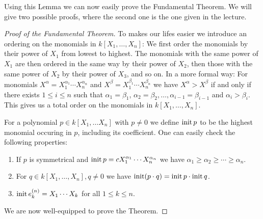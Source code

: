 Using this Lemma we can now easily prove the Fundamental Theorem.
We will give two possible proofs, where the second one is the one given in the lecture.


\begin{proof}[Proof of the Fundamental Theorem]
  To makes our lifes easier we introduce an ordering on the monomials in $k[X_1, \dotsc, X_n]$:
  We first order the monomials by their power of $X_1$ from lowest to highest.
  The monomials with the same power of $X_1$ are then ordered in the same way by their power of $X_2$, then those with the same power of $X_2$ by their power of $X_3$, and so on.
  In a more formal way:
  For monomials $X^\alpha = X_1^{\alpha_1} \dotsm X_n^{\alpha_n}$ and $X^\beta = X_1^{\beta_1} \dotsm X_n^{\beta_n}$ we have $X^\alpha > X^\beta$ if and only if there exists $1 \leq i \leq n$ such that $\alpha_1 = \beta_1$, $\alpha_2 = \beta_2, \dotsc, \alpha_{i-1} = \beta_{i-1}$ and $\alpha_i > \beta_i$.
  This gives us a total order on the monomials in $k[X_1, \dotsc, X_n]$.
  
  For a polynomial $p \in k[X_1, \dotsc X_n]$ with $p \neq 0$ we define $\operatorname{init} p$ to be the highest monomial occuring in $p$, including its coefficient.
  One can easily check the following properties:
  \begin{enumerate}[label=\emph{\alph*)},leftmargin=*]
    \item
      If $p$ is symmetrical and $\operatorname{init} p = c X_1^{\alpha_1} \dotsm X_n^{\alpha_n}$ we have $\alpha_1 \geq \alpha_2 \geq \dotsb \geq \alpha_n$.
    \item
      For $q \in k[X_1, \dotsc, X_n], q \neq 0$ we have $\operatorname{init} (p \cdot q) = \operatorname{init} p \cdot \operatorname{init} q$.
    \item
      $\operatorname{init} e^{(n)}_k = X_1 \dotsm X_k$ for all $1 \leq k \leq n$.
  \end{enumerate}
  We are now well-equipped to prove the Theorem. 
  

\end{proof}
